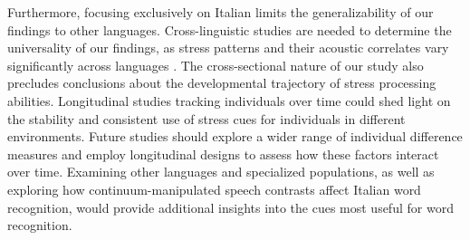 Furthermore, focusing exclusively on Italian limits the generalizability of our findings to other languages. Cross-linguistic studies are needed to determine the universality of our findings, as stress patterns and their acoustic correlates vary significantly across languages \cite{cutler2007dutch}. The cross-sectional nature of our study also precludes conclusions about the developmental trajectory of stress processing abilities. Longitudinal studies tracking individuals over time could shed light on the stability and consistent use of stress cues for individuals in different environments. Future studies should explore a wider range of individual difference measures and employ longitudinal designs to assess how these factors interact over time. Examining other languages and specialized populations, as well as exploring how continuum-manipulated speech contrasts affect Italian word recognition, would provide additional insights into the cues most useful for word recognition.


